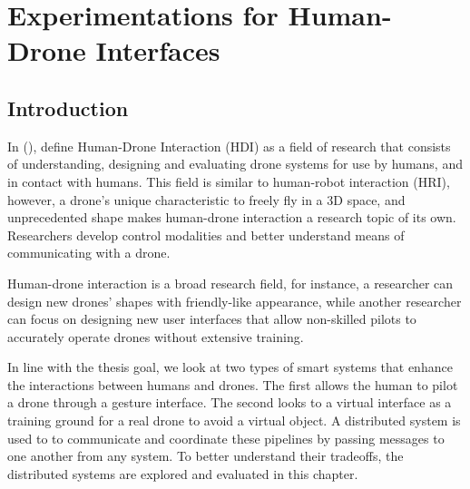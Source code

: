 \chapter{Experimentations for Human-Drone Interfaces}\label{c2}






\section{Introduction}


In  (\citeyear{tezza_andujar_2019}),  define Human-Drone Interaction (HDI) as a field of research that consists of understanding, designing and evaluating drone systems for use by humans, and in contact with humans. This field is similar to human-robot interaction (HRI), however, a drone’s unique characteristic to freely fly in a 3D space, and unprecedented shape makes human-drone interaction a research topic of its own. Researchers develop control modalities and better understand means of communicating with a drone.

Human-drone interaction is a broad research field, for instance, a researcher can design new drones’ shapes with friendly-like appearance, while another researcher can focus on designing new user interfaces that allow non-skilled pilots to accurately operate drones without extensive training.

In line with the thesis goal, we look at two types of smart systems that enhance the interactions between humans and drones. The first allows the human to pilot a drone through a gesture interface. The second looks to a virtual interface as a training ground for a real drone to avoid a virtual object. A distributed system is used to to communicate and coordinate these pipelines by passing messages to one another from any system. To better understand their tradeoffs, the distributed systems are explored and evaluated in this chapter.

